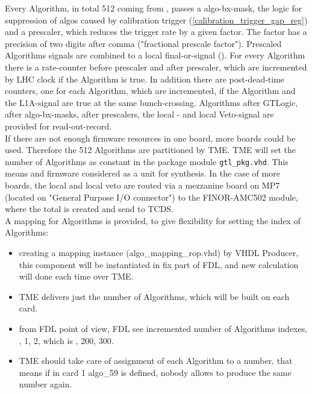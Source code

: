 Every Algorithm, in total 512 coming from \ugtl, passes a algo-bx-mask, the logic for suppression of algos caused by calibration trigger (\ref{calibration_trigger_gap_reg}) and a prescaler, which reduces the trigger rate by a given factor. The factor has a precision of two digits after comma ("fractional prescale factor"). Prescaled Algorithms signals are combined to a local final-or-signal (\finor).
For every Algorithm there is a rate-counter before prescaler and after prescaler, which are incremented by LHC clock if the Algorithm is true. In addition there are post-dead-time counters, one for each Algorithm, which are incremented,
if the Algorithm and the L1A-signal are true at the same bunch-crossing.
Algorithms after GTLogic, after algo-bx-masks, after prescalers, the local \finor- and local Veto-signal are provided for read-out-record.\\
If there are not enough firmware resources in one \ugt board, more boards could be used. Therefore the 512 Algorithms are partitioned by TME. TME will set the number of Algorithms as
constant in the package module \texttt{gtl\_pkg.vhd}. This means \ugtl and \ufdl firmware considered as a unit for synthesis. In the case of more \ugt boards, the local \finor and local veto are routed via
a mezzanine board on MP7 (located on "General Purpose I/O connector") to the FINOR-AMC502 module, where the total \finor is created and send to TCDS.\\
A mapping for Algorithms is provided, to give flexibility for setting the index of Algorithms:
\begin {itemize}
\item creating a mapping instance (algo\_mapping\_rop.vhd) by VHDL Producer, this component will be instantiated in fix part of FDL, and new calculation will done each time over TME.
\item TME delivers just the number of Algorithms, which will be built on each card.
\item from FDL point of view, FDL see incremented number of Algorithms indexes, , 1, 2, which is , 200, 300.
\item TME should take care of assignment of each Algorithm to a number, that means if in card 1 algo\_59 is defined, nobody allows to produce the same number again.
\end {itemize}

